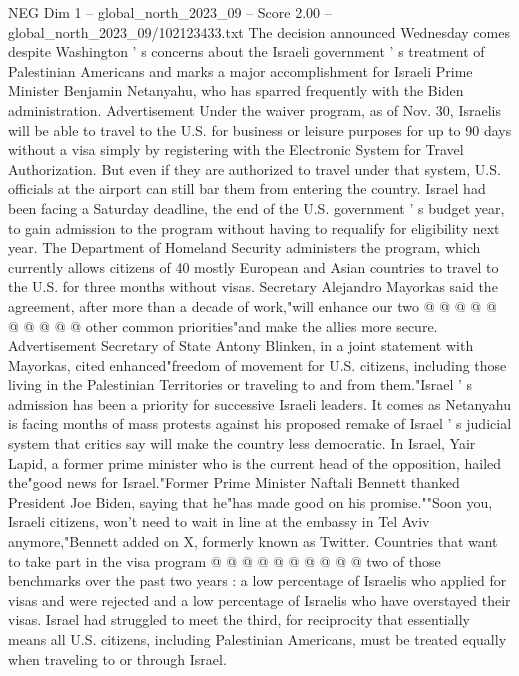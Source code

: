 \begin{textsample}{NEG Dim 1 – global\_north\_2023\_09 – Score 2.00 – global\_north\_2023\_09/102123433.txt}  \label{ex:f1_neg_339}
The decision announced Wednesday comes despite Washington ' s concerns about the Israeli government ' s treatment of Palestinian Americans and marks a major accomplishment for Israeli Prime Minister Benjamin Netanyahu, who has sparred frequently with the Biden administration.
Advertisement Under the waiver program, as of Nov. 30, Israelis will be able to travel to the U.S. for business or leisure purposes for up to 90 days without a visa simply by registering with the Electronic System for Travel Authorization.
But even if they are authorized to travel under that system, U.S. officials at the airport can still bar them from entering the country.
Israel had been facing a Saturday deadline, the end of the U.S. government ' s budget year, to gain admission to the program without having to requalify for eligibility next year.
The Department of Homeland Security administers the program, which currently allows citizens of 40 mostly European and Asian countries to travel to the U.S. for three months without visas.
Secretary Alejandro Mayorkas said the agreement, after more than a decade of work,"will enhance our two @ @ @ @ @ @ @ @ @ @ other common priorities"and make the allies more secure.
Advertisement Secretary of State Antony Blinken, in a joint statement with Mayorkas, cited enhanced"freedom of movement for U.S. citizens, including those living in the Palestinian Territories or traveling to and from them."Israel ' s admission has been a priority for successive Israeli leaders.
It comes as Netanyahu is facing months of mass protests against his proposed remake of Israel ' s judicial system that critics say will make the country less democratic.
In Israel, Yair Lapid, a former prime minister who is the current head of the opposition, hailed the"good news for Israel."Former Prime Minister Naftali Bennett thanked President Joe Biden, saying that he"has made good on his promise.""Soon you, Israeli citizens, won't need to wait in line at the embassy in Tel Aviv anymore,"Bennett added on X, formerly known as Twitter.
Countries that want to take part in the visa program @ @ @ @ @ @ @ @ @ @ two of those benchmarks over the past two years : a low percentage of Israelis who applied for visas and were rejected and a low percentage of Israelis who have overstayed their visas.
Israel had struggled to meet the third, for reciprocity that essentially means all U.S. citizens, including Palestinian Americans, must be treated equally when traveling to or through Israel.

\end{textsample}
